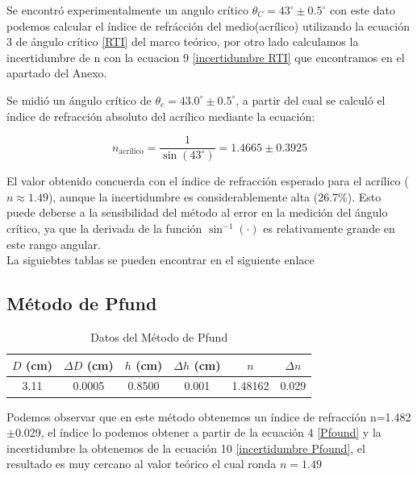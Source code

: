 \documentclass[article,12pt]{elsarticle}
\begin{document}
 Se encontró experimentalmente un angulo crítico $\theta_C=43^{\circ}\pm 0.5^{\circ}$ con este dato podemos calcular el índice de refrácción del medio(acrílico) utilizando la ecuación 3 de ángulo crítico \eqref{RTI} del marco teórico, por otro lado calculamos la incertidumbre de n con la ecuacion 9 \eqref{incertidumbre RTI} que encontramos en el apartado del Anexo.


Se midió un ángulo crítico de $\theta_c = 43.0^\circ \pm 0.5^\circ$, a partir del cual se calculó el índice de refracción absoluto del acrílico mediante la ecuación:


\begin{equation}
n_{\text{acrílico}} = \frac{1}{\sin(43^\circ)} = 1.4665 \pm 0.3925
\end{equation}

El valor obtenido concuerda con el índice de refracción esperado para el acrílico ($n \approx 1.49$), aunque la incertidumbre es considerablemente alta (26.7\%). Esto puede deberse a la sensibilidad del método al error en la medición del ángulo crítico, ya que la derivada de la función $\sin^{-1}(\cdot)$ es relativamente grande en este rango angular.\\

La siguiebtes tablas se pueden encontrar en el siguiente enlace \cite{Excel}


\subsection*{Método de Pfund}
\begin{table}[H]
    \centering
    \begin{tabular}{|c|c|c|c|c|c|}
        \hline
        $D$ (cm) & $\Delta D$ (cm) & $h$ (cm) & $\Delta h$ (cm) & $n$ & $\Delta n$ \\
        \hline
        3.11 & 0.0005 & 0.8500 & 0.001 & 1.48162 & 0.029 \\
        \hline
    \end{tabular}
    \caption{Datos del Método de Pfund}
    \label{tab:pfund}
\end{table}

Podemos observar que en este método obtenemos un índice de refracción n=1.482$\pm$0.029, el índice lo podemos obtener a partir de la ecuación  4 \eqref{Pfound} y la incertidumbre la obtenemos de la ecuación 10 \eqref{incertidumbre Pfound}, el resultado es muy cercano al valor teórico el cual ronda $n= 1.49$
\end{document}

